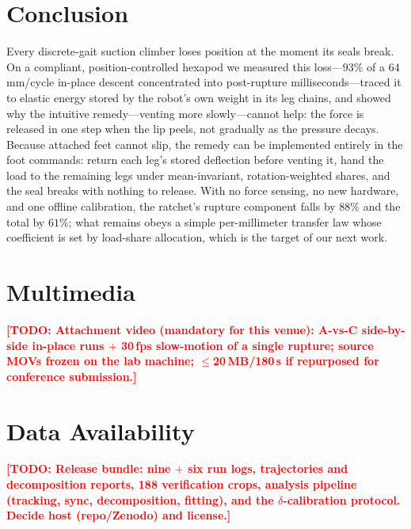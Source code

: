 \documentclass[journal]{IEEEtran}
\newcommand{\TODO}[1]{\textcolor{red}{\textbf{[TODO: #1]}}}
\begin{document}
\section{Conclusion}

Every discrete-gait suction climber loses position at the moment its
seals break. On a compliant, position-controlled hexapod we measured
this loss---$93\%$ of a $64$\,mm/cycle in-place descent concentrated
into post-rupture milliseconds---traced it to elastic energy stored by
the robot's own weight in its leg chains, and showed why the intuitive
remedy---venting more slowly---cannot help: the force is released in one
step when the lip peels, not gradually as the pressure decays. Because
attached
feet cannot slip, the remedy can be implemented entirely in the foot
commands: return each
leg's stored deflection before venting it, hand the load to the
remaining legs under mean-invariant, rotation-weighted shares, and the
seal breaks with nothing to release. With no force sensing, no new
hardware, and one offline calibration, the ratchet's rupture component
falls by $88\%$ and the total by $61\%$; what remains obeys a simple
per-millimeter transfer law whose coefficient is set by load-share
allocation, which is the target of our next work.

\section*{Multimedia}
\TODO{Attachment video (mandatory for this venue): A-vs-C side-by-side
in-place runs $+$ 30\,fps slow-motion of a single rupture; source MOVs
frozen on the lab machine; $\le$20\,MB/180\,s if repurposed for
conference submission.}

\section*{Data Availability}
\TODO{Release bundle: nine $+$ six run logs, trajectories and
decomposition reports, 188 verification crops, analysis pipeline
(tracking, sync, decomposition, fitting), and the $\delta$-calibration
protocol. Decide host (repo/Zenodo) and license.}



\end{document}
